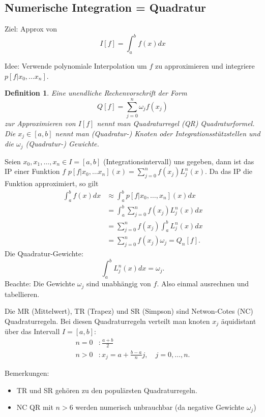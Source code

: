\documentclass[a4paper]{article}
\newtheorem{defn}{Definition}
\begin{document}
\subsection{Numerische Integration = Quadratur}

Ziel: Approx von
\[
  I[f] = \int_a^b f(x) dx
\]

Idee: Verwende polynomiale Interpolation um $f$ zu approximieren und
integriere $p[f | x_0, \ldots x_n]$.

\begin{defn}
  Eine unendliche Rechenvorschrift der Form
  \[
    Q[f] = \sum_{j=0}^n \omega_j f(x_j)
  \]
  zur Approximieren von $I[f]$ nennt man Quadraturregel (QR) Quadraturformel.
  Die $x_j \in [a,b]$ nennt man (Quadratur-) Knoten oder
  Integrationsstützstellen und die $\omega_j$ (Quadratur-) Gewichte.
\end{defn}

Seien $x_0, x_1, \ldots, x_n \in I = [a,b]$ (Integrationsintervall) uns
gegeben, dann ist das IP einer Funktion $f$ $p[f|x_0, \ldots x_n](x) =
\sum_{j=0}^n f(x_j) L^n_j(x)$. Da das IP die Funktion approximiert, so gilt
\begin{align*}
  \int_a^b f(x) dx &\approx \int_a^b p[f|x_0,\ldots,x_n](x) dx \\
    &= \int_a^b \sum_{j=0}^n f(x_j) L_j^n(x) dx \\
    &= \sum_{j=0}^n f(x_j) \int_a^b L_j^n(x) dx \\
    &= \sum_{j=0}^n f(x_j) \omega_j = Q_n[f].
\end{align*}
Die Quadratur-Gewichte:
\[
  \int_a^b L_j^n(x) dx = \omega_j.
\]
Beachte: Die Gewichte $\omega_j$ sind unabhängig von $f$. Also einmal
ausrechnen und tabellieren.

Die MR (Mittelwert), TR (Trapez) und SR (Simpson) sind Netwon-Cotes (NC)
Quadraturregeln. Bei diesen Quadraturregeln verteilt man knoten $x_j$
äquidistant über das Intervall $I = [a,b]$:
\begin{align*}
  n = 0 &: \frac{a+b}{2} \\
  n > 0 &: x_j = a + \frac{b-a}{n} j, \quad j = 0, \ldots, n.
\end{align*}

Bemerkungen: 
\begin{itemize}
  \item TR und SR gehören zu den populärsten Quadraturregeln.
  \item NC QR mit $n > 6$ werden numerisch unbrauchbar
    (da negative Gewichte $\omega_j$)
\end{itemize}
\end{document}
